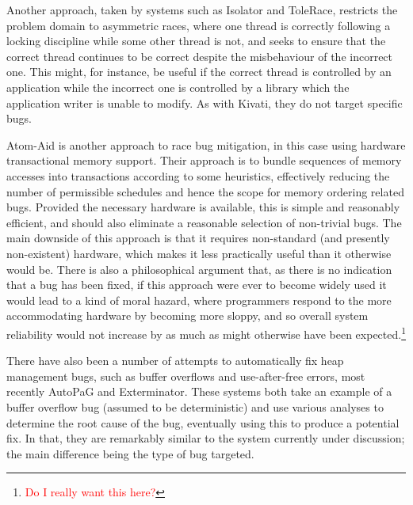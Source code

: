 \documentclass[10pt,twocolumn,preprint,natbib,authoryear]{sigplanconf}
\newcommand{\editorial}[1]{\textcolor{red}{\footnote{\textcolor{red}{#1}}}}
\begin{document}
Another approach, taken by systems such as
Isolator\cite{Ramalingam2009} and ToleRace\cite{Kirovski2007},
restricts the problem domain to asymmetric races, where one thread is
correctly following a locking discipline while some other thread is
not, and seeks to ensure that the correct thread continues to be
correct despite the misbehaviour of the incorrect one.  This might,
for instance, be useful if the correct thread is controlled by an
application while the incorrect one is controlled by a library which
the application writer is unable to modify.  As with Kivati, they do
not target specific bugs.

Atom-Aid\cite{Lucia2009} is another approach to race bug
mitigation, in this case using hardware transactional memory support.
Their approach is to bundle sequences of memory accesses into
transactions according to some heuristics, effectively reducing the
number of permissible schedules and hence the scope for memory
ordering related bugs.  Provided the necessary hardware is available,
this is simple and reasonably efficient, and should also eliminate a
reasonable selection of non-trivial bugs.  The main downside of this
approach is that it requires non-standard (and presently non-existent)
hardware, which makes it less practically useful than it otherwise
would be.  There is also a philosophical argument that, as there is no
indication that a bug has been fixed, if this approach were ever to
become widely used it would lead to a kind of moral hazard, where
programmers respond to the more accommodating hardware by becoming
more sloppy, and so overall system reliability would not increase by
as much as might otherwise have been expected.\editorial{Do I really
  want this here?}

There have also been a number of attempts to automatically fix heap
management bugs, such as buffer overflows and use-after-free errors,
most recently AutoPaG\cite{Lin2007} and Exterminator\cite{Novark2007}.
These systems both take an example of a buffer overflow bug (assumed
to be deterministic) and use various analyses to determine the root
cause of the bug, eventually using this to produce a potential fix.
In that, they are remarkably similar to the system currently under
discussion; the main difference being the type of bug targeted.
\end{document}
